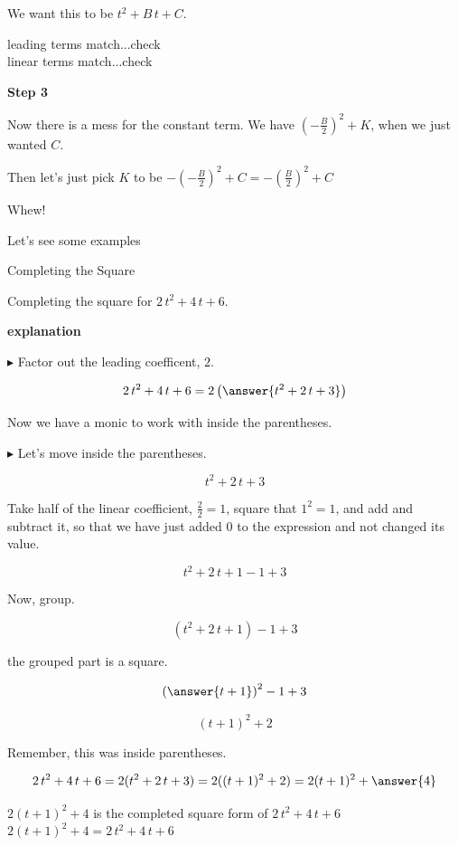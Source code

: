 \documentclass{ximera}
\begin{document}
We want this to be $t^2 + B \, t + C$. 

leading terms match...check \\
linear terms match...check 


\textbf{\textcolor{blue!75!black}{Step 3}} 


Now there is a mess for the constant term.  We have $\left( -\frac{B}{2}\right )^2 + K$, when we just wanted $C$.  

Then let's just pick $K$ to be $-\left( -\frac{B}{2}\right )^2 + C = -\left(\frac{B}{2}\right)^2 + C$



Whew!

Let's see some examples








\begin{example} Completing the Square



Completing the square for $2 \, t^2 + 4 \, t + 6$.


\textbf{\textcolor{red!75!green}{explanation}} 

$\blacktriangleright$ Factor out the leading coefficent, $2$.

\[     2 \, t^2 + 4 \, t + 6 = 2 \left( \answer{t^2 + 2 \, t + 3} \right)   \] 


Now we have a monic to work with inside the parentheses. 


$\blacktriangleright$ Let's move inside the parentheses.

\[ t^2 + 2 \, t + 3 \]

Take half of the linear coefficient, $\frac{2}{2} = 1$, square that $1^2 = 1$, and add and subtract it, so that we have just added $0$ to the expression and not changed its value.


\[ t^2 + 2 \, t + 1 - 1 +3 \]


Now, group.

\[ (t^2 + 2 \, t + 1) - 1 + 3 \]

the grouped part is a square.

\[ \left( \answer{t+1} \right)^2 - 1 + 3 \]

\[ (t+1)^2 + 2 \]

Remember, this was inside parentheses.

\[     2 \, t^2 + 4 \, t + 6 = 2 (t^2 + 2 \, t + 3)  = 2 ((t+1)^2 + 2) =  2 (t+1)^2 + \answer{4}\] 


$2 (t+1)^2 + 4$ is the completed square form of $2 \, t^2 + 4 \, t + 6$ \\


$2 (t+1)^2 + 4 = 2 \, t^2 + 4 \, t + 6$





\end{example}
\end{document}

